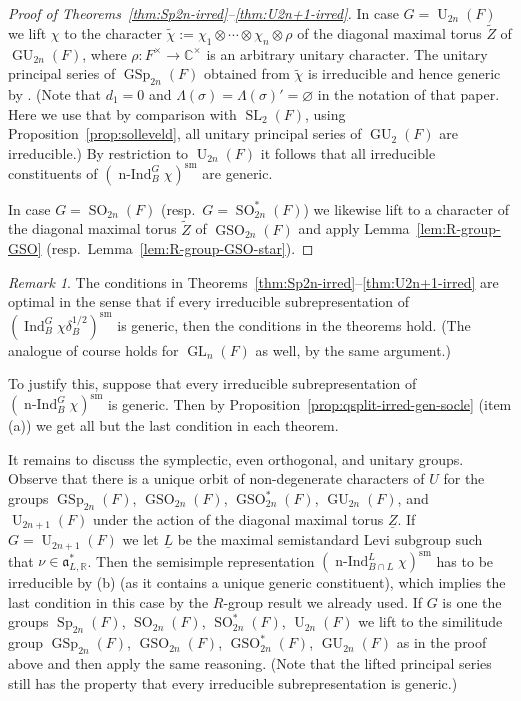 \documentclass[a4paper]{amsart}
\numberwithin{equation}{section}
\theoremstyle{remark}
\newtheorem{remark}[thm]{Remark}
\theoremstyle{definition}
\DeclareMathOperator{\Ind}{Ind}
\DeclareMathOperator{\nInd}{n-Ind}
\newcommand{\C}{\mathbb{C}}
\newcommand{\R}{\mathbb{R}}
\DeclareMathOperator{\SL}{SL}
\DeclareMathOperator{\U}{U}
\DeclareMathOperator{\GU}{GU}
\DeclareMathOperator{\Sp}{Sp}
\DeclareMathOperator{\GSp}{GSp}
\DeclareMathOperator{\SO}{SO}
\DeclareMathOperator{\GSO}{GSO}
\DeclareMathOperator{\GL}{GL}
\newcommand{\sm}{\mathrm{sm}}
\newcommand{\alggrp}[1]{\underline{#1}}
\newcommand{\wt}[1]{\widetilde{#1}}
\begin{document}
\begin{proof}[Proof of Theorems~\ref{thm:Sp2n-irred}--\ref{thm:U2n+1-irred}]
  In case $G = \U_{2n}(F)$ we lift $\chi$ to the character $\wt\chi := \chi_1 \otimes \cdots \otimes \chi_n \otimes \rho$ of the diagonal maximal torus $\wt Z$ of $\GU_{2n}(F)$, where $\rho : F^\times \to \C^\times$ is an arbitrary unitary character. 
  The unitary principal series of $\GSp_{2n}(F)$ obtained from $\wt\chi$ is irreducible and hence generic by \cite[Theorem 2.6]{MR1464132}.
  (Note that $d_1 = 0$ and $\Lambda(\sigma) = \Lambda(\sigma)' = \varnothing$ in the notation of that paper.
  Here we use that by comparison with $\SL_2(F)$, using Proposition~\ref{prop:solleveld}, all unitary principal series of $\GU_2(F)$ are irreducible.)
  By restriction to $\U_{2n}(F)$ it follows that all irreducible constituents of $(\nInd_{B}^{G}\chi)^{\sm}$ are generic.

  In case $G = \SO_{2n}(F)$ (resp.\ $G = \SO^*_{2n}(F)$) we likewise lift to a character of the diagonal maximal torus $\wt Z$ of $\GSO_{2n}(F)$ and apply Lemma~\ref{lem:R-group-GSO}
  (resp.\ Lemma~\ref{lem:R-group-GSO-star}).
\end{proof}


\begin{remark}\label{rk:optimal}
  The conditions in Theorems~\ref{thm:Sp2n-irred}--\ref{thm:U2n+1-irred} are optimal in the sense that if every irreducible subrepresentation
  of $(\Ind_{B}^{G}\chi\delta_B^{1/2})^\sm$ is generic, then the conditions in the theorems hold.
  (The analogue of course holds for $\GL_n(F)$ as well, by the same argument.)

  To justify this, suppose that every irreducible subrepresentation of $(\nInd_{B}^{G}\chi)^\sm$ is generic.
  Then by Proposition~\ref{prop:qsplit-irred-gen-socle} (item (a)) we get all but the last condition in each theorem.
  
  It remains to discuss the symplectic, even orthogonal, and unitary groups.
  Observe that there is a unique orbit of non-degenerate characters of $U$ for the groups $\GSp_{2n}(F)$, $\GSO_{2n}(F)$, $\GSO_{2n}^*(F)$, $\GU_{2n}(F)$, and $\U_{2n+1}(F)$ under the action of the diagonal maximal torus $\alggrp{Z}$.
  If $G = \U_{2n+1}(F)$ we let $\alggrp{L}$ be the maximal semistandard Levi subgroup such that $\nu \in \mathfrak a^*_{L,\R}$.
  Then the semisimple representation $(\nInd_{B \cap L}^{L} \chi)^{\sm}$ has to be irreducible by (b) (as it contains a unique generic constituent), which implies the last condition in this case by the $R$-group result we already used.
  If $G$ is one the groups $\Sp_{2n}(F)$, $\SO_{2n}(F)$, $\SO^*_{2n}(F)$, $\U_{2n}(F)$ we lift to the similitude group $\GSp_{2n}(F)$, $\GSO_{2n}(F)$, $\GSO^*_{2n}(F)$, $\GU_{2n}(F)$ as in the proof above and then apply the same reasoning.
  (Note that the lifted principal series still has the property that every irreducible subrepresentation is generic.)
\end{remark}
\end{document}
